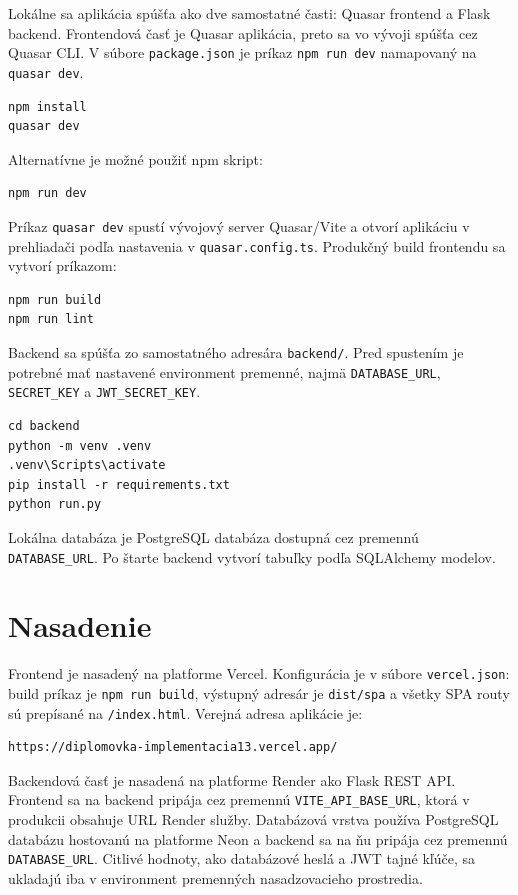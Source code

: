 ﻿\documentclass[12pt,a4paper]{article}
\begin{document}
Lokálne sa aplikácia spúšťa ako dve samostatné časti: Quasar frontend a Flask backend. Frontendová časť je Quasar aplikácia, preto sa vo vývoji spúšťa cez Quasar CLI. V súbore \texttt{package.json} je príkaz \texttt{npm run dev} namapovaný na \texttt{quasar dev}.

\begin{lstlisting}
npm install
quasar dev
\end{lstlisting}

Alternatívne je možné použiť npm skript:

\begin{lstlisting}
npm run dev
\end{lstlisting}

Príkaz \texttt{quasar dev} spustí vývojový server Quasar/Vite a otvorí aplikáciu v prehliadači podľa nastavenia v \texttt{quasar.config.ts}. Produkčný build frontendu sa vytvorí príkazom:

\begin{lstlisting}
npm run build
npm run lint
\end{lstlisting}

Backend sa spúšťa zo samostatného adresára \texttt{backend/}. Pred spustením je potrebné mať nastavené environment premenné, najmä \texttt{DATABASE\_URL}, \texttt{SECRET\_KEY} a \texttt{JWT\_SECRET\_KEY}.

\begin{lstlisting}
cd backend
python -m venv .venv
.venv\Scripts\activate
pip install -r requirements.txt
python run.py
\end{lstlisting}

Lokálna databáza je PostgreSQL databáza dostupná cez premennú \texttt{DATABASE\_URL}. Po štarte backend vytvorí tabuľky podľa SQLAlchemy modelov.

\section{Nasadenie}

Frontend je nasadený na platforme Vercel. Konfigurácia je v súbore \texttt{vercel.json}: build príkaz je \texttt{npm run build}, výstupný adresár je \texttt{dist/spa} a všetky SPA routy sú prepísané na \texttt{/index.html}. Verejná adresa aplikácie je:

\begin{lstlisting}
https://diplomovka-implementacia13.vercel.app/
\end{lstlisting}

Backendová časť je nasadená na platforme Render ako Flask REST API. Frontend sa na backend pripája cez premennú \texttt{VITE\_API\_BASE\_URL}, ktorá v produkcii obsahuje URL Render služby. Databázová vrstva používa PostgreSQL databázu hostovanú na platforme Neon a backend sa na ňu pripája cez premennú \texttt{DATABASE\_URL}. Citlivé hodnoty, ako databázové heslá a JWT tajné kľúče, sa ukladajú iba v environment premenných nasadzovacieho prostredia.
\end{document}
